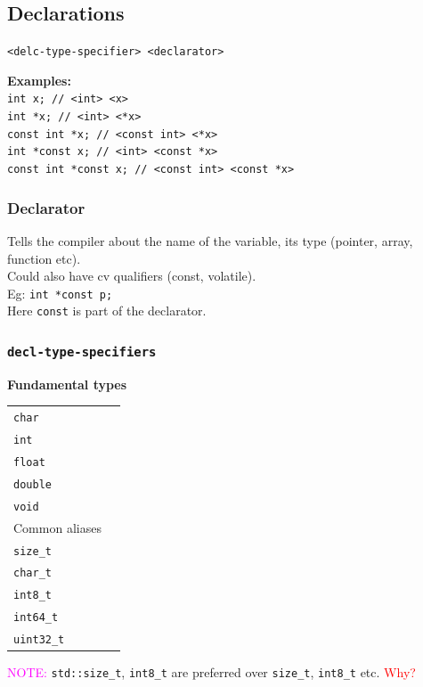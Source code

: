 \subsection{Declarations}

\texttt{<delc-type-specifier> <declarator>}
\begin{mdframed}[nobreak=true,backgroundcolor=gray!10,linecolor=Firebrick4]
\textbf{Examples:}\\
\texttt{int x; // <int> <x>}\\
\texttt{int *x; // <int> <*x>}\\
\texttt{const int *x; // <const int> <*x>}\\
\texttt{int *const x; // <int> <const *x>}\\
\texttt{const int *const x; // <const int> <const *x>}
\end{mdframed}

\subsubsection{Declarator} 
Tells the compiler about the name of the variable, its type (pointer, array, function etc).\\
Could also have cv qualifiers (const, volatile).\\
Eg: \texttt{int *const p;}\\
Here \texttt{const} is part of the declarator.

\subsubsection{\texttt{decl-type-specifiers}}

\textbf{Fundamental types}\\
\begin{tabularx}{\linewidth}{lX}
    \hline
    \texttt{char}       & \\
    \texttt{int}        & \\
    \texttt{float}      & \\
    \texttt{double}     & \\
    \texttt{void}       & \\
    \hline
Common aliases & \\
    \hline
    \texttt{size\_t}     & \\
    \texttt{char\_t}     & \\
    \texttt{int8\_t}     & \\
    \texttt{int64\_t}    & \\
    \texttt{uint32\_t}   & \\
    \hline
\end{tabularx}
\textcolor{magenta}{NOTE:} \texttt{std::size\_t}, \texttt{int8\_t} are
preferred over \texttt{size\_t}, \texttt{int8\_t} etc. \textcolor{red}{Why?}


